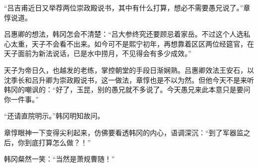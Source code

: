 “吕吉甫近日又举荐两位崇政殿说书，其中有什么打算，想必不需要愚兄说了。”章惇说道。

吕惠卿的想法，韩冈怎会不清楚：“吕大参终究还要顾忌着家岳。不过这个人选私心太重，天子不会看不出来。如今可不是熙宁初年，再想靠着区区两位经筵官，在天子面前为新法说话，已是水中捞月，不见得会有多少成效。”

天子为帝日久，也越发的老练，掌控朝堂的手段日渐娴熟。吕惠卿效法王安石，以沈季长和吕升卿为崇政殿说书，这一做法，章惇也是不以为然。但他今天不是来听韩冈的嘲讽的：“好了，玉昆，别的愚兄就不多说了。今天愚兄来此本意只是要问你一件事。”

“还请直院明示。”韩冈明知故问。

章惇眼神一下变得尖利起来，仿佛要看透韩冈的内心，语调深沉：“到了军器监之后，你到底打算怎么做？！”

韩冈粲然一笑：“当然是萧规曹随！”

